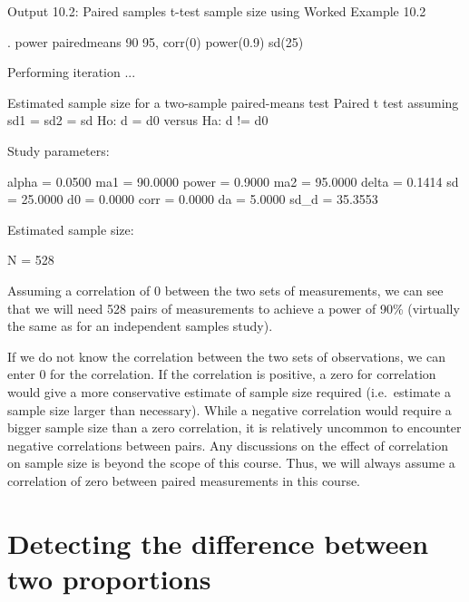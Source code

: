 \documentclass[
]{memoir}
\newenvironment{Shaded}{\begin{snugshade}}{\end{snugshade}}
\newcommand{\NormalTok}[1]{#1}
\begin{document}
Output 10.2: Paired samples t-test sample size using Worked Example 10.2

\begin{Shaded}
\begin{Highlighting}[]
\NormalTok{. power pairedmeans 90 95, corr(0) power(0.9) sd(25)}

\NormalTok{Performing iteration ...}

\NormalTok{Estimated sample size for a two{-}sample paired{-}means test}
\NormalTok{Paired t test assuming sd1 = sd2 = sd}
\NormalTok{Ho: d = d0  versus  Ha: d != d0}

\NormalTok{Study parameters:}

\NormalTok{        alpha =    0.0500          ma1 =   90.0000}
\NormalTok{        power =    0.9000          ma2 =   95.0000}
\NormalTok{        delta =    0.1414           sd =   25.0000}
\NormalTok{           d0 =    0.0000         corr =    0.0000}
\NormalTok{           da =    5.0000}
\NormalTok{         sd\_d =   35.3553}

\NormalTok{Estimated sample size:}

\NormalTok{            N =       528}
\end{Highlighting}
\end{Shaded}

Assuming a correlation of 0 between the two sets of measurements, we can see that we will need 528 pairs of measurements to achieve a power of 90\% (virtually the same as for an independent samples study).

If we do not know the correlation between the two sets of observations, we can enter 0 for the correlation. If the correlation is positive, a zero for correlation would give a more conservative estimate of sample size required (i.e.~estimate a sample size larger than necessary). While a negative correlation would require a bigger sample size than a zero correlation, it is relatively uncommon to encounter negative correlations between pairs. Any discussions on the effect of correlation on sample size is beyond the scope of this course. Thus, we will always assume a correlation of zero between paired measurements in this course.

\hypertarget{detecting-the-difference-between-two-proportions}{%
\section{Detecting the difference between two proportions}\label{detecting-the-difference-between-two-proportions}}
\end{document}
